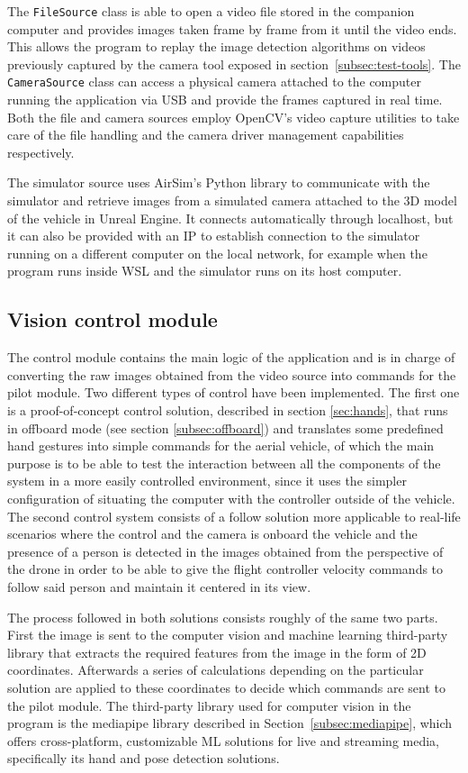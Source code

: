 The \texttt{FileSource} class is able to open a video file stored in the companion computer and provides images taken frame by frame from it until the video ends.
This allows the program to replay the image detection algorithms on videos previously captured by the camera tool exposed in section~\ref{subsec:test-tools}.
The \texttt{CameraSource} class can access a physical camera attached to the computer running the application via USB and provide the frames captured in real time.
Both the file and camera sources employ OpenCV's video capture utilities to take care of the file handling and the camera driver management capabilities respectively.

The simulator source uses AirSim's Python library to communicate with the simulator and retrieve images from a simulated camera attached to the 3D model of the vehicle in Unreal Engine.
It connects automatically through localhost, but it can also be provided with an IP to establish connection to the simulator running on a different computer on the local network, for example when the program runs inside WSL and the simulator runs on its host computer.

\subsection{Vision control module}
The control module contains the main logic of the application and is in charge of converting the raw images obtained from the video source into commands for the pilot module.
Two different types of control have been implemented.
The first one is a proof-of-concept control solution, described in section \ref{sec:hands}, that runs in offboard mode (see section \ref{subsec:offboard}) and translates some predefined hand gestures into simple commands for the aerial vehicle, of which the main purpose is to be able to test the interaction between all the components of the system in a more easily controlled environment, since it uses the simpler configuration of situating the computer with the controller outside of the vehicle.
The second control system consists of a follow solution more applicable to real-life scenarios where the control and the camera is onboard the vehicle and the presence of a person is detected in the images obtained from the perspective of the drone in order to be able to give the flight controller velocity commands to follow said person and maintain it centered in its view.

The process followed in both solutions consists roughly of the same two parts.
First the image is sent to the computer vision and machine learning third-party library that extracts the required features from the image in the form of 2D coordinates.
Afterwards a series of calculations depending on the particular solution are applied to these coordinates to decide which commands are sent to the pilot module.
The third-party library used for computer vision in the program is the mediapipe library described in Section~\ref{subsec:mediapipe}, which offers cross-platform, customizable ML solutions for live and streaming media, specifically its hand and pose detection solutions.

